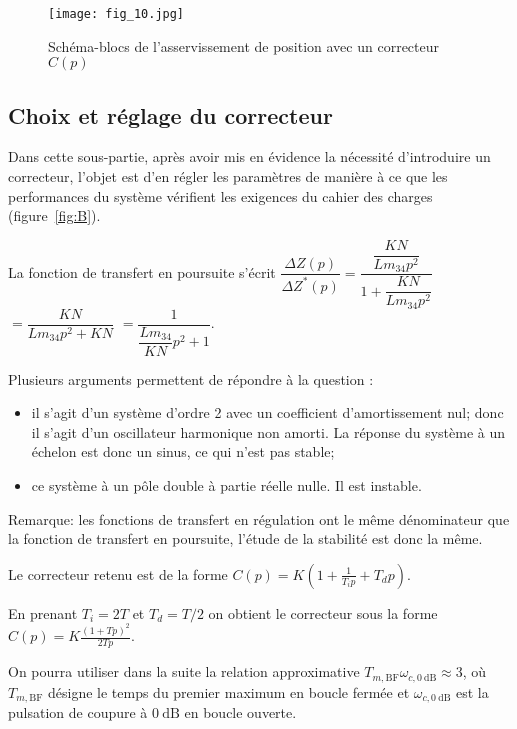 \begin{figure}[H]
\centering
\texttt{[image: fig\_10.jpg]}
\caption{\label{fig:10} Schéma-blocs de l'asservissement de position avec un correcteur $C(p)$}
\end{figure}
\fi

\subsection{Choix et réglage du correcteur}
\ifprof
\else
Dans cette sous-partie, après avoir mis en évidence la nécessité d'introduire un correcteur, l'objet est d'en régler les paramètres de manière à ce que les performances du système vérifient les exigences du cahier des charges (figure~\ref{fig:B}).
\fi

\ifprof
\begin{corrige}
La fonction de transfert en poursuite s'écrit $\dfrac{\Delta Z(p)}{\Delta Z^*(p)}=\dfrac{\dfrac{KN}{Lm_{34}p^2}}{1+\dfrac{KN}{Lm_{34}p^2}}$
 $=\dfrac{KN}{Lm_{34}p^2+KN}$
  $=\dfrac{1}{\dfrac{Lm_{34}}{KN}p^2+1}$.

Plusieurs arguments permettent de répondre à la question : 
\begin{itemize}
\item il s'agit d'un système d'ordre 2 avec un coefficient d'amortissement nul; donc il s'agit d'un oscillateur harmonique non amorti. La réponse du système à un échelon est donc un sinus, ce qui n'est pas stable;
\item ce système à un pôle double à partie réelle nulle. Il est instable. 
\end{itemize}

Remarque: les fonctions de transfert en régulation ont le même dénominateur que la fonction de transfert en poursuite, l'étude de la stabilité est donc la même.

\end{corrige}
\else
\fi
\ifprof
\else

Le correcteur retenu est de la forme
$
C(p)=K\left(1+\frac{1}{T_{i} p}+T_{d} p\right) .
$

En prenant $T_{i}=2 T$ et $T_{d}=T / 2$ on obtient le correcteur sous la forme
$
C(p)=K \frac{(1+T p)^{2}}{2 T p} .
$

On pourra utiliser dans la suite la relation approximative $T_{m, \mathrm{BF}} \omega_{c, 0 \mathrm{~dB}} \approx 3$, où $T_{m, \mathrm{BF}}$ désigne le temps du premier maximum en boucle fermée et $\omega_{c, 0 \mathrm{~dB}}$ est la pulsation de coupure à $0 \mathrm{~dB}$ en boucle ouverte.

